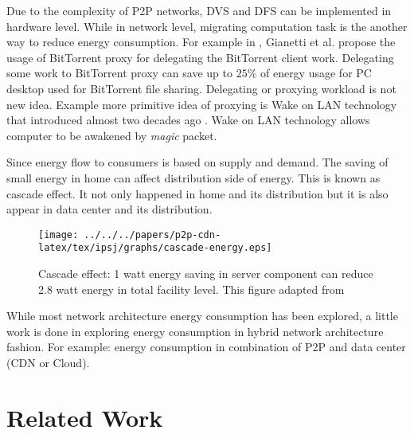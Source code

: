 Due to the complexity of P2P networks, DVS and DFS can be implemented in hardware level.  
While in network level, migrating computation task is the another way to reduce energy consumption.  
For example in \cite{6249349}, Gianetti et al. propose the usage of BitTorrent proxy for  delegating the BitTorrent client work. 
Delegating some work to BitTorrent proxy can save up to $25\%$ of energy usage for PC desktop used for BitTorrent file sharing.
Delegating or proxying workload is not new idea.  
Example more primitive idea of proxying is Wake on LAN technology that introduced almost two decades ago \cite{wakeonlan}.
Wake on LAN technology allows computer to be awakened by \textit{magic} packet.

Since energy flow to consumers is based on supply and demand. 
The saving of small energy in home can affect distribution side of energy. 
This is known as cascade effect. 
It not only happened in home and its distribution but it is also appear in data center and its distribution.  

\begin{figure}[tb]
\begin{center}
\texttt{[image: ../../../papers/p2p-cdn-latex/tex/ipsj/graphs/cascade-energy.eps]}
\end{center}
\caption{Cascade effect:  1 watt energy saving in server component can reduce 2.8 watt energy in total facility level. This figure adapted from \cite{ciscocascade}} 
\label{fig:energycascade}
\end{figure}

While most network architecture energy consumption has been explored, a little work is done in exploring energy consumption in hybrid network architecture fashion. 
For example: energy consumption in combination of P2P and data center (CDN or Cloud).


\section{Related Work}

